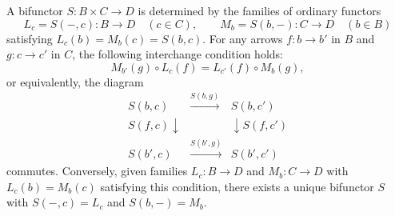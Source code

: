 A bifunctor $S: B \times C \to D$ is determined by the families of ordinary functors
$$L_c = S(-, c): B \to D \quad (c \in C), \qquad M_b = S(b, -): C \to D \quad (b \in B)$$
satisfying $L_c(b) = M_b(c) = S(b, c)$. For any arrows $f: b \to b'$ in $B$ and $g: c \to c'$ in $C$, the following interchange condition holds:
$$M_{b'}(g) \circ L_c(f) = L_{c'}(f) \circ M_b(g),$$
or equivalently, the diagram
$$\begin{array}{ccc}
S(b, c) & \xrightarrow{S(b, g)} & S(b, c') \\
{\scriptstyle S(f, c)}\downarrow & & \downarrow{\scriptstyle S(f, c')} \\
S(b', c) & \xrightarrow{S(b', g)} & S(b', c')
\end{array}$$
commutes. Conversely, given families $L_c: B \to D$ and $M_b: C \to D$ with $L_c(b) = M_b(c)$ satisfying this condition, there exists a unique bifunctor $S$ with $S(-, c) = L_c$ and $S(b, -) = M_b$.
